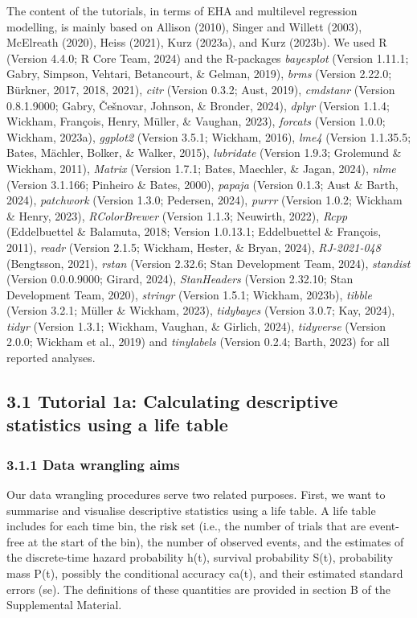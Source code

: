 \documentclass[
  man, donotrepeattitle,floatsintext]{apa6}
\begin{document}
The content of the tutorials, in terms of EHA and multilevel regression modelling, is mainly based on Allison (2010), Singer and Willett (2003), McElreath (2020), Heiss (2021), Kurz (2023a), and Kurz (2023b). We used R (Version 4.4.0; R Core Team, 2024) and the R-packages \emph{bayesplot} (Version 1.11.1; Gabry, Simpson, Vehtari, Betancourt, \& Gelman, 2019), \emph{brms} (Version 2.22.0; Bürkner, 2017, 2018, 2021), \emph{citr} (Version 0.3.2; Aust, 2019), \emph{cmdstanr} (Version 0.8.1.9000; Gabry, Češnovar, Johnson, \& Bronder, 2024), \emph{dplyr} (Version 1.1.4; Wickham, François, Henry, Müller, \& Vaughan, 2023), \emph{forcats} (Version 1.0.0; Wickham, 2023a), \emph{ggplot2} (Version 3.5.1; Wickham, 2016), \emph{lme4} (Version 1.1.35.5; Bates, Mächler, Bolker, \& Walker, 2015), \emph{lubridate} (Version 1.9.3; Grolemund \& Wickham, 2011), \emph{Matrix} (Version 1.7.1; Bates, Maechler, \& Jagan, 2024), \emph{nlme} (Version 3.1.166; Pinheiro \& Bates, 2000), \emph{papaja} (Version 0.1.3; Aust \& Barth, 2024), \emph{patchwork} (Version 1.3.0; Pedersen, 2024), \emph{purrr} (Version 1.0.2; Wickham \& Henry, 2023), \emph{RColorBrewer} (Version 1.1.3; Neuwirth, 2022), \emph{Rcpp} (Eddelbuettel \& Balamuta, 2018; Version 1.0.13.1; Eddelbuettel \& François, 2011), \emph{readr} (Version 2.1.5; Wickham, Hester, \& Bryan, 2024), \emph{RJ-2021-048} (Bengtsson, 2021), \emph{rstan} (Version 2.32.6; Stan Development Team, 2024), \emph{standist} (Version 0.0.0.9000; Girard, 2024), \emph{StanHeaders} (Version 2.32.10; Stan Development Team, 2020), \emph{stringr} (Version 1.5.1; Wickham, 2023b), \emph{tibble} (Version 3.2.1; Müller \& Wickham, 2023), \emph{tidybayes} (Version 3.0.7; Kay, 2024), \emph{tidyr} (Version 1.3.1; Wickham, Vaughan, \& Girlich, 2024), \emph{tidyverse} (Version 2.0.0; Wickham et al., 2019) and \emph{tinylabels} (Version 0.2.4; Barth, 2023) for all reported analyses.

\subsection{3.1 Tutorial 1a: Calculating descriptive statistics using a life table}\label{tutorial-1a-calculating-descriptive-statistics-using-a-life-table}

\subsubsection{3.1.1 Data wrangling aims}\label{data-wrangling-aims}

Our data wrangling procedures serve two related purposes. First, we want to summarise and visualise descriptive statistics using a life table. A life table includes for each time bin, the risk set (i.e., the number of trials that are event-free at the start of the bin), the number of observed events, and the estimates of the discrete-time hazard probability h(t), survival probability S(t), probability mass P(t), possibly the conditional accuracy ca(t), and their estimated standard errors (se). The definitions of these quantities are provided in section B of the Supplemental Material.
\end{document}
